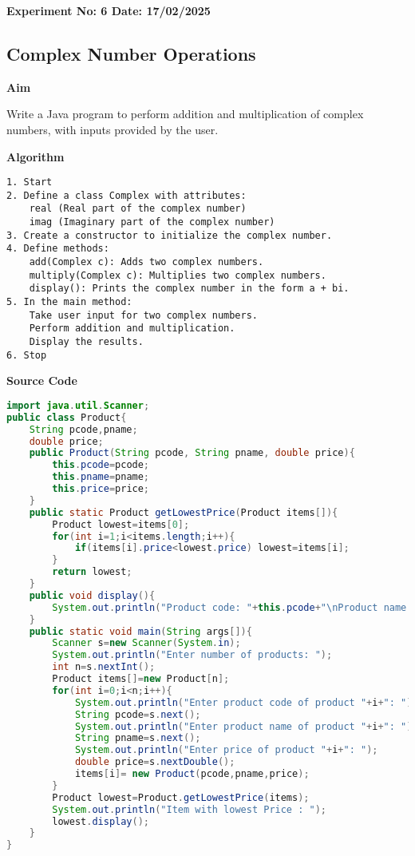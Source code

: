 \textbf{Experiment No: 6 \hfill Date: 17/02/2025}

\begin{center}
    \Large \subsection*{Complex Number Operations}
\end{center}

\textbf{Aim}
\vspace{0.5cm}

Write a Java program to perform addition and multiplication of complex numbers, with inputs provided by the user.


\vspace{0.5cm}
\textbf{Algorithm}
\vspace{0.5cm}
\begin{verbatim}
1. Start
2. Define a class Complex with attributes:
    real (Real part of the complex number)
    imag (Imaginary part of the complex number)
3. Create a constructor to initialize the complex number.
4. Define methods:
    add(Complex c): Adds two complex numbers.
    multiply(Complex c): Multiplies two complex numbers.
    display(): Prints the complex number in the form a + bi.
5. In the main method:
    Take user input for two complex numbers.
    Perform addition and multiplication.
    Display the results.
6. Stop
\end{verbatim}

\vspace{0.5cm}
\textbf{Source Code}
\begin{lstlisting}[language=Java]
import java.util.Scanner;
public class Product{
	String pcode,pname;
	double price;
	public Product(String pcode, String pname, double price){
		this.pcode=pcode;
		this.pname=pname;
		this.price=price;
	}
	public static Product getLowestPrice(Product items[]){
		Product lowest=items[0];
		for(int i=1;i<items.length;i++){
			if(items[i].price<lowest.price) lowest=items[i];
		}
		return lowest;
	}
	public void display(){
		System.out.println("Product code: "+this.pcode+"\nProduct name: "+this.pname+"\nPrice: "+price);
	}
	public static void main(String args[]){
		Scanner s=new Scanner(System.in);
		System.out.println("Enter number of products: ");
		int n=s.nextInt();
		Product items[]=new Product[n];
		for(int i=0;i<n;i++){
			System.out.println("Enter product code of product "+i+": ");
			String pcode=s.next();
			System.out.println("Enter product name of product "+i+": ");
			String pname=s.next();
			System.out.println("Enter price of product "+i+": ");
			double price=s.nextDouble();
			items[i]= new Product(pcode,pname,price);
		}
		Product lowest=Product.getLowestPrice(items);
		System.out.println("Item with lowest Price : ");
		lowest.display();
	}
}
\end{lstlisting}

